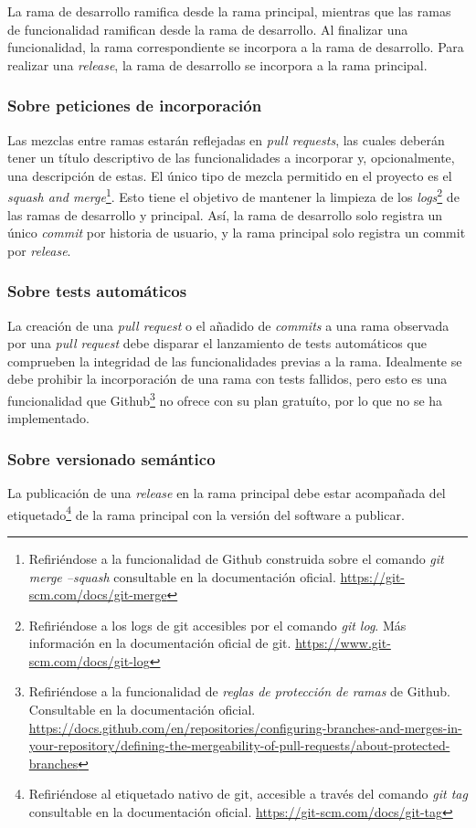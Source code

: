 La rama de desarrollo ramifica desde la rama principal, mientras que las ramas de funcionalidad ramifican desde la rama de desarrollo. Al finalizar una funcionalidad, la rama correspondiente se incorpora a la rama de desarrollo. Para realizar una \textit{release}, la rama de desarrollo se incorpora a la rama principal.
    
\subsubsection{Sobre peticiones de incorporación}

Las mezclas entre ramas estarán reflejadas en \textit{pull requests}, las cuales deberán tener un título descriptivo de las funcionalidades a incorporar y, opcionalmente, una descripción de estas. El único tipo de mezcla permitido en el proyecto es el \textit{squash and merge}\footnote{Refiriéndose a la funcionalidad de Github construida sobre el comando \textit{git merge --squash} consultable en la documentación oficial. \url{https://git-scm.com/docs/git-merge}}. Esto tiene el objetivo de mantener la limpieza de los \textit{logs}\footnote{Refiriéndose a los logs de git accesibles por el comando \textit{git log}. Más información en la documentación oficial de git. \url{https://www.git-scm.com/docs/git-log}} de las ramas de desarrollo y principal. Así, la rama de desarrollo solo registra un único \textit{commit} por historia de usuario, y la rama principal solo registra un commit por \textit{release}.
    
\subsubsection{Sobre tests automáticos}

La creación de una \textit{pull request} o el añadido de \textit{commits} a una rama observada por una \textit{pull request} debe disparar el lanzamiento de tests automáticos que comprueben la integridad de las funcionalidades previas a la rama. Idealmente se debe prohibir la incorporación de una rama con tests fallidos, pero esto es una funcionalidad que Github\footnote{Refiriéndose a la funcionalidad de \textit{reglas de protección de ramas} de Github. Consultable en la documentación oficial. \url{https://docs.github.com/en/repositories/configuring-branches-and-merges-in-your-repository/defining-the-mergeability-of-pull-requests/about-protected-branches}} no ofrece con su plan gratuíto, por lo que no se ha implementado.
    
\subsubsection{Sobre versionado semántico}

La publicación de una \textit{release} en la rama principal debe estar acompañada del etiquetado\footnote{Refiriéndose al etiquetado nativo de git, accesible a través del comando \textit{git tag} consultable en la documentación oficial. \url{https://git-scm.com/docs/git-tag}} de la rama principal con la versión del software a publicar.
